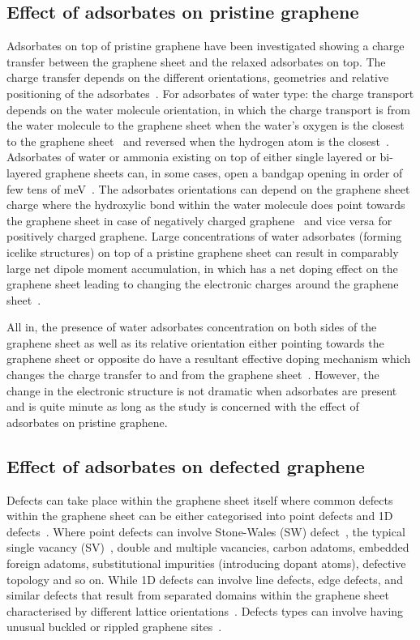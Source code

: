 \subsection{Effect of adsorbates on pristine graphene}
Adsorbates on top of pristine graphene have been investigated showing a charge transfer between the graphene sheet and the relaxed adsorbates on top. The charge transfer depends on the different orientations, geometries and relative positioning of the adsorbates~\cite{Leenaerts2008, Leenaerts2009}. For adsorbates of water type: the charge transport depends on the water molecule orientation, in which the charge transport is from the water molecule to the graphene sheet when the water's oxygen is the closest to the graphene sheet~\cite{Freitas2011} and reversed when the hydrogen atom is the closest~\cite{Leenaerts2008}. Adsorbates of water or ammonia existing on top of either single layered or bi-layered graphene sheets can, in some cases, open a bandgap opening in order of few tens of meV~\cite{Ribeiro2008}. The adsorbates orientations can depend on the graphene sheet charge where the hydroxylic bond within the water molecule does point towards the graphene sheet in case of negatively charged graphene~\cite{Tuan2013} and vice versa for positively charged graphene. Large concentrations of water adsorbates (forming icelike structures) on top of a pristine graphene sheet can result in comparably large net dipole moment accumulation, in which has a net doping effect on the graphene sheet leading to changing the electronic charges around the graphene sheet~\cite{Leenaerts2009}.

All in, the presence of water adsorbates concentration on both sides of the graphene sheet as well as its relative orientation either pointing towards the graphene sheet or opposite do have a resultant effective doping mechanism which changes the charge transfer to and from the graphene sheet~\cite{Leenaerts2009, Freitas2011, Tuan2013}. However, the change in the electronic structure is not dramatic when adsorbates are present~\cite{Wehling2008} and is quite minute as long as the study is concerned with the effect of adsorbates on pristine graphene. 
%
%
\subsection{Effect of adsorbates on defected graphene}
Defects can take place within the graphene sheet itself where common defects within the graphene sheet can be either categorised into point defects and 1D defects~\cite{Banhart2011}. Where point defects can involve Stone-Wales (SW) defect~\cite{Stone1986}, the typical single vacancy (SV)~\cite{Ugeda2010}, double and multiple vacancies, carbon adatoms, embedded foreign adatoms, substitutional impurities (introducing dopant atoms), defective topology and so on. While 1D defects can involve line defects, edge defects, and similar defects that result from separated domains within the graphene sheet characterised by different lattice orientations~\cite{Banhart2011}. Defects types can involve having unusual buckled or rippled graphene sites~\cite{Dutta2014}.

